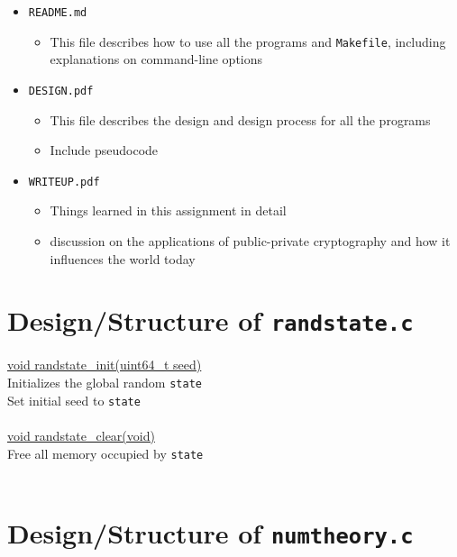 \documentclass[12pt]{article}
\begin{document}
\begin{itemize}
\begin{itemize}
   \end{itemize}
   \item \texttt{README.md}
   \begin{itemize}
     \item This file describes how to use all the programs and \texttt{Makefile}, including explanations on command-line options
   \end{itemize}
   \item \texttt{DESIGN.pdf}
   \begin{itemize}
     \item This file describes the design and design process for all the programs
     \item Include pseudocode
   \end{itemize}
   \item \texttt{WRITEUP.pdf}
   \begin{itemize}
     \item Things learned in this assignment in detail
     \item discussion on the applications of public-private cryptography and how it influences the world today
   \end{itemize}
 \end{itemize}

\section{Design/Structure of \texttt{randstate.c}}

\underline{void randstate\_init(uint64\_t seed)} \\
\indent Initializes the global random \texttt{state} \\
\indent Set initial seed to \texttt{state} \\
\\
\underline{void randstate\_clear(void)} \\
\indent Free all memory occupied by \texttt{state} \\
\\
\section{Design/Structure of \texttt{numtheory.c}}
\end{document}
